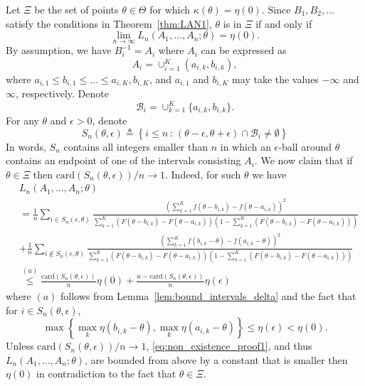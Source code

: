 \documentclass[letterpaper, 11pt]{IEEEtran}      %
\newcommand{\card}{\mathrm{card}}
\begin{document}
Let $\Xi$ be the set of points $\theta \in \Theta$ for which $\kappa(\theta) = \eta(0)$. 
%
Since $B_1,B_2,\ldots$ satisfy the conditions in Theorem~\ref{thm:LAN1}, $\theta$ is in $\Xi$ if and only if
\begin{equation}
\label{eq:non_existence_proof}
\lim_{n\to \infty} L_n(A_1,\ldots,A_n;\theta) = \eta(0). 
\end{equation}
By assumption, we have $B_i^{-1} = A_i$ where $A_i$ can be expressed as
\[
A_i = \cup_{i=1}^K (a_{i,k},b_{i,k}), 
\]
where $a_{i,1} \leq b_{i,1} \leq \ldots \leq a_{i,K}, b_{i,K}$, and $a_{i,1}$ and $b_{i,K}$ may take the values $-\infty$ and $\infty$, respectively. Denote
\[
\mathcal B_i = \cup_{k=1}^{K}\{a_{i,k},b_{i,k}\}.
\]
For any $\theta$ and $\epsilon>0$, denote 
\[
S_n(\theta, \epsilon) \triangleq \left\{ i\leq n \,:\, (\theta-\epsilon,\theta+\epsilon) \cap \mathcal B_i \neq \emptyset \right\}
\]
In words, $S_n$ contains all integers smaller than $n$ in which an $\epsilon$-ball around $\theta$ contains an endpoint of one of the intervals consisting $A_i$. 
%
We now claim that 
if $\theta \in \Xi$ then $\card(S_n(\theta, \epsilon))/n \to 1$. Indeed, for such $\theta$ we have
\begin{align}
& L_n(A_1,\ldots,A_n; \theta) \nonumber \\
& = \frac{1}{n} \sum_{i \in S_n(\epsilon,\theta)}  
\frac{ \left(\sum_{k=1}^{K}  f(\theta - b_{i,k})- f(\theta - a_{i,k}) \right)^2}{ \sum_{k=1}^{K} \left( F(\theta - b_{i,k})- F(\theta - a_{i,k}) \right) \left(1-\sum_{k=1}^{K} \left( F(\theta - b_{i,k})- F(\theta - a_{i,k}) \right)\right)} \nonumber \\
& 
+ \frac{1}{n}\sum_{i \notin S_n(\epsilon,\theta) } \frac{ \left(\sum_{k=1}^{K}  f(b_{i,k}-\theta) - f(a_{i,k}-\theta) \right)^2} { \sum_{k=1}^{K} \left( F(\theta - b_{i,k})- F(\theta - a_{i,k}) \right) \left(1-\sum_{k=1}^{K} \left( F(\theta - b_{i,k})- F(\theta - a_{i,k}) \right)\right)} \nonumber \\
& \overset{(a)}{\leq}
\frac{\card\left(S_n(\theta,\epsilon)\right)}{n} \eta(0) + \frac{n-\card\left(S_n(\theta,\epsilon) \right) }{n} \eta(\epsilon) 
 \label{eq:non_existence_proof1}
\end{align}
where $(a)$ follows from Lemma~\ref{lem:bound_intervals_delta} and the fact that for $i \in S_n(\theta, \epsilon)$, 
\[
\max\left\{ \max_k \eta(b_{i,k}-\theta) , \max_k \eta(a_{i,k}-\theta)  \right\} \leq \eta(\epsilon) < \eta(0). 
\]
Unless  $\card \left(S_n(\theta, \epsilon) \right)/n \to 1$, \eqref{eq:non_existence_proof1}, and thus $L_n(A_1,\ldots,A_n ; \theta)$, are bounded from above by a constant that is smaller then $\eta(0)$ in contradiction to the fact that $\theta \in \Xi$. \par
\end{document}
